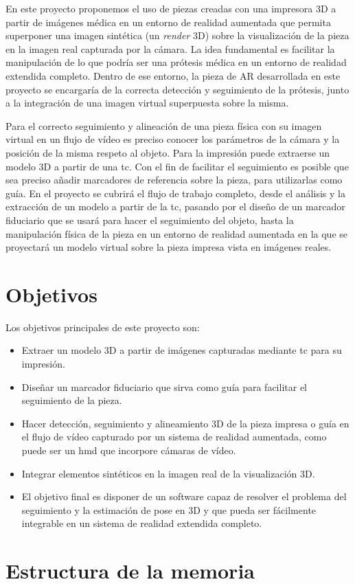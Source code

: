 En este proyecto proponemos el uso de piezas creadas con una impresora 3D a partir de imágenes médica en un entorno de realidad aumentada que permita superponer una imagen sintética (un \emph{render} 3D) sobre la visualización de la pieza en la imagen real capturada por la cámara. La idea fundamental es facilitar la manipulación de lo que podría ser una prótesis médica en un entorno de realidad extendida completo. Dentro de ese entorno, la pieza de AR desarrollada en este proyecto se encargaría de la correcta detección y seguimiento de la prótesis, junto a la integración de una imagen virtual superpuesta sobre la misma.

Para el correcto seguimiento y alineación de una pieza física con su imagen virtual en un flujo de vídeo es preciso conocer los parámetros de la cámara y la posición de la misma respeto al objeto. Para la impresión puede extraerse un modelo 3D a partir de una \acrfull{tc}. Con el fin de facilitar el seguimiento es posible que sea preciso añadir marcadores de referencia sobre la pieza, para utilizarlas como guía. En el proyecto se cubrirá el flujo de trabajo completo, desde el análisis y la extracción de un modelo a partir de la \acrshort{tc}, pasando por el diseño de un marcador fiduciario que se usará para hacer el seguimiento del objeto, hasta la manipulación física de la pieza en un entorno de realidad aumentada en la que se proyectará un modelo virtual sobre la pieza impresa vista en imágenes reales.

\section{Objetivos}
Los objetivos principales de este proyecto son:
\begin{itemize}
	\item Extraer un modelo 3D a partir de imágenes capturadas mediante \acrfull{tc} para su impresión.
	\item Diseñar un marcador fiduciario que sirva como guía para facilitar el seguimiento de la pieza.
	\item Hacer detección, seguimiento y alineamiento 3D de la pieza impresa o guía en el flujo de vídeo capturado por un sistema de realidad aumentada, como puede ser un \acrshort{hmd} que incorpore cámaras de vídeo.
	\item Integrar elementos sintéticos en la imagen real de la visualización 3D.
	\item El objetivo final es disponer de un software capaz de resolver el problema del seguimiento y la estimación de pose en 3D y que pueda ser fácilmente integrable en un sistema de realidad extendida completo.
\end{itemize}

\section{Estructura de la memoria}